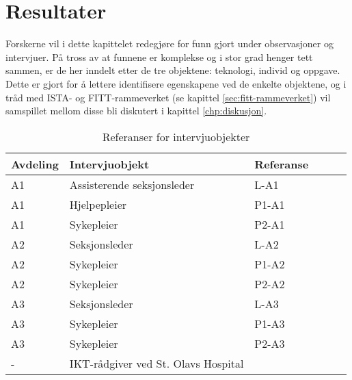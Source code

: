 \chapter{Resultater}
\label{chp:resultater} 
Forskerne vil i dette kapittelet redegjøre for funn gjort under observasjoner og intervjuer. På tross av at funnene er komplekse og i stor grad henger tett sammen, er de her inndelt etter de tre objektene: teknologi, individ og oppgave. Dette er gjort for å lettere identifisere egenskapene ved de enkelte objektene, og i tråd med ISTA- og FITT-rammeverket (se kapittel \ref{sec:fitt-rammeverket}) vil samspillet mellom disse bli diskutert i kapittel \ref{chp:diskusjon}.

\begin{table}[H]\centering
    \begin{tabular}{ |l|l|l|l|l|l| }
    \hline
    Avdeling & Intervjuobjekt & Referanse \\ \hline
       A1 & Assisterende seksjonsleder & L-A1 \\ \hline
       A1 & Hjelpepleier & P1-A1 \\ \hline
       A1 & Sykepleier & P2-A1 \\ \hline
       A2 & Seksjonsleder & L-A2 \\ \hline
       A2 & Sykepleier & P1-A2 \\ \hline
       A2 & Sykepleier & P2-A2 \\ \hline
       A3 & Seksjonsleder & L-A3 \\ \hline
       A3 & Sykepleier & P1-A3 \\ \hline
       A3 & Sykepleier & P2-A3 \\ \hline
       - & IKT-rådgiver ved St. Olavs Hospital &  \\ \hline
    \end{tabular}
    \caption {Referanser for intervjuobjekter}
    \label{referanserintervju}
\end{table}

